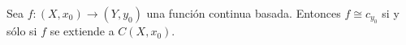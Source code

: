 \begin{ejercicio}
\label{eje:f extended to CX}
    Sea $f:(X,x_0)\to(Y,y_0)$ una función continua basada. Entonces $f\cong c_{y_0}$ si y sólo si $f$ se extiende a $C(X,x_0)$.
\end{ejercicio}

\begin{demostracion}

\end{demostracion}
